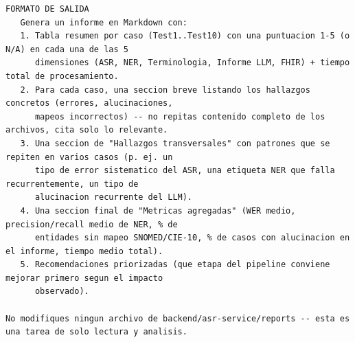 \begin{lstlisting}
FORMATO DE SALIDA
   Genera un informe en Markdown con:
   1. Tabla resumen por caso (Test1..Test10) con una puntuacion 1-5 (o N/A) en cada una de las 5
      dimensiones (ASR, NER, Terminologia, Informe LLM, FHIR) + tiempo total de procesamiento.
   2. Para cada caso, una seccion breve listando los hallazgos concretos (errores, alucinaciones,
      mapeos incorrectos) -- no repitas contenido completo de los archivos, cita solo lo relevante.
   3. Una seccion de "Hallazgos transversales" con patrones que se repiten en varios casos (p. ej. un
      tipo de error sistematico del ASR, una etiqueta NER que falla recurrentemente, un tipo de
      alucinacion recurrente del LLM).
   4. Una seccion final de "Metricas agregadas" (WER medio, precision/recall medio de NER, % de
      entidades sin mapeo SNOMED/CIE-10, % de casos con alucinacion en el informe, tiempo medio total).
   5. Recomendaciones priorizadas (que etapa del pipeline conviene mejorar primero segun el impacto
      observado).

No modifiques ningun archivo de backend/asr-service/reports -- esta es una tarea de solo lectura y analisis.
\end{lstlisting}

